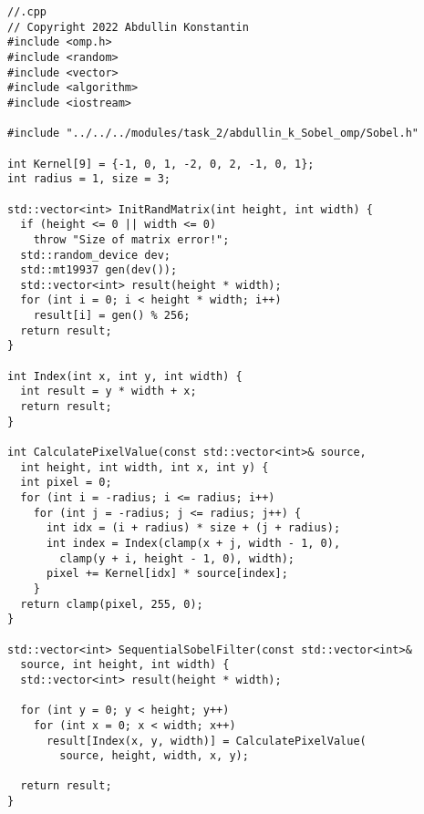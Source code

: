\documentclass[12pt]{article}
\begin{document}
\begin{lstlisting}
//.cpp
// Copyright 2022 Abdullin Konstantin
#include <omp.h>
#include <random>
#include <vector>
#include <algorithm>
#include <iostream>

#include "../../../modules/task_2/abdullin_k_Sobel_omp/Sobel.h"

int Kernel[9] = {-1, 0, 1, -2, 0, 2, -1, 0, 1};
int radius = 1, size = 3;

std::vector<int> InitRandMatrix(int height, int width) {
  if (height <= 0 || width <= 0)
    throw "Size of matrix error!";
  std::random_device dev;
  std::mt19937 gen(dev());
  std::vector<int> result(height * width);
  for (int i = 0; i < height * width; i++)
    result[i] = gen() % 256;
  return result;
}

int Index(int x, int y, int width) {
  int result = y * width + x;
  return result;
}

int CalculatePixelValue(const std::vector<int>& source,
  int height, int width, int x, int y) {
  int pixel = 0;
  for (int i = -radius; i <= radius; i++)
    for (int j = -radius; j <= radius; j++) {
      int idx = (i + radius) * size + (j + radius);
      int index = Index(clamp(x + j, width - 1, 0),
        clamp(y + i, height - 1, 0), width);
      pixel += Kernel[idx] * source[index];
    }
  return clamp(pixel, 255, 0);
}

std::vector<int> SequentialSobelFilter(const std::vector<int>&
  source, int height, int width) {
  std::vector<int> result(height * width);

  for (int y = 0; y < height; y++)
    for (int x = 0; x < width; x++)
      result[Index(x, y, width)] = CalculatePixelValue(
        source, height, width, x, y);

  return result;
}


\end{lstlisting}
\end{document}
